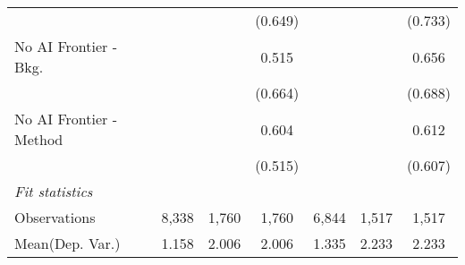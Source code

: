 \begin{tabular}{lcccccc}
                           &               &         & (0.649)      &              &         & (0.733)\\   
   No AI Frontier - Bkg.   &               &         & 0.515        &              &         & 0.656\\   
                           &               &         & (0.664)      &              &         & (0.688)\\   
   No AI Frontier - Method &               &         & 0.604        &              &         & 0.612\\   
                           &               &         & (0.515)      &              &         & (0.607)\\   
   \midrule
   \emph{Fit statistics}\\
   Observations            & 8,338         & 1,760   & 1,760        & 6,844        & 1,517   & 1,517\\  
Mean(Dep. Var.) & 1.158 & 2.006 & 2.006 & 1.335 & 2.233 & 2.233 \\
   

\end{tabular}
